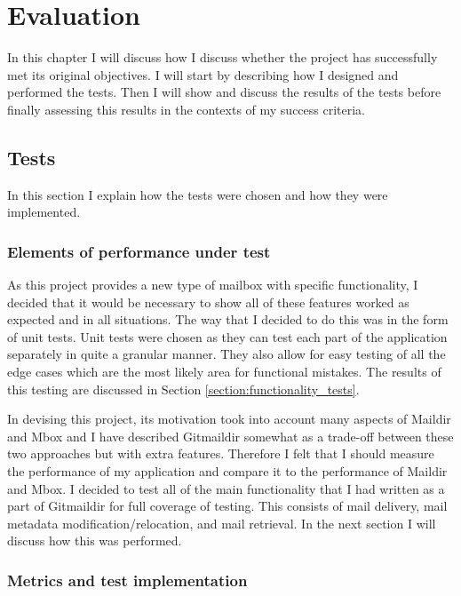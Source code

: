 \chapter{Evaluation}

In this chapter I will discuss how I discuss whether the project has successfully met its original objectives. I will start by describing how I designed and performed the tests. Then I will show and discuss the results of the tests before finally assessing this results in the contexts of my success criteria.

\section{Tests}

In this section I explain how the tests were chosen and how they were implemented.

\subsection{Elements of performance under test}

As this project provides a new type of mailbox with specific functionality, I decided that it would be necessary to show all of these features worked as expected and in all situations. The way that I decided to do this was in the form of unit tests. Unit tests were chosen as they can test each part of the application separately in quite a granular manner. They also allow for easy testing of all the edge cases which are the most likely area for functional mistakes. The results of this testing are discussed in Section \ref{section:functionality_tests}.

In devising this project, its motivation took into account many aspects of Maildir and Mbox and I have described Gitmaildir somewhat as a trade-off between these two approaches but with extra features. Therefore I felt that I should measure the performance of my application and compare it to the performance of Maildir and Mbox. I decided to test all of the main functionality that I had written as a part of Gitmaildir for full coverage of testing. This consists of mail delivery, mail metadata modification/relocation, and mail retrieval. In the next section I will discuss how this was performed.

\subsection{Metrics and test implementation}

